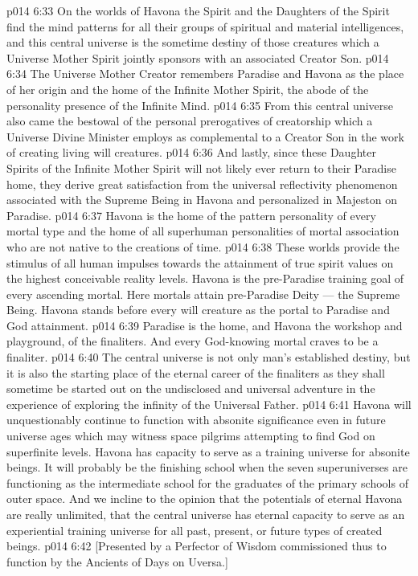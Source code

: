\vs p014 6:33 On the worlds of Havona the Spirit and the Daughters of the Spirit find the mind patterns for all their groups of spiritual and material intelligences, and this central universe is the sometime destiny of those creatures which a Universe Mother Spirit jointly sponsors with an associated Creator Son.
\vs p014 6:34 The Universe Mother Creator remembers Paradise and Havona as the place of her origin and the home of the Infinite Mother Spirit, the abode of the personality presence of the Infinite Mind.
\vs p014 6:35 From this central universe also came the bestowal of the personal prerogatives of creatorship which a Universe Divine Minister employs as complemental to a Creator Son in the work of creating living will creatures.
\vs p014 6:36 And lastly, since these Daughter Spirits of the Infinite Mother Spirit will not likely ever return to their Paradise home, they derive great satisfaction from the universal reflectivity phenomenon associated with the Supreme Being in Havona and personalized in Majeston on Paradise.
\vs p014 6:37 \bibnobreakspace {} Havona is the home of the pattern personality of every mortal type and the home of all superhuman personalities of mortal association who are not native to the creations of time.
\vs p014 6:38 These worlds provide the stimulus of all human impulses towards the attainment of true spirit values on the highest conceivable reality levels. Havona is the pre\hyp{}Paradise training goal of every ascending mortal. Here mortals attain pre\hyp{}Paradise Deity --- the Supreme Being. Havona stands before every will creature as the portal to Paradise and God attainment.
\vs p014 6:39 Paradise is the home, and Havona the workshop and playground, of the finaliters. And every God\hyp{}knowing mortal craves to be a finaliter.
\vs p014 6:40 The central universe is not only man’s established destiny, but it is also the starting place of the eternal career of the finaliters as they shall sometime be started out on the undisclosed and universal adventure in the experience of exploring the infinity of the Universal Father.
\vs p014 6:41 \pc Havona will unquestionably continue to function with absonite significance even in future universe ages which may witness space pilgrims attempting to find God on superfinite levels. Havona has capacity to serve as a training universe for absonite beings. It will probably be the finishing school when the seven superuniverses are functioning as the intermediate school for the graduates of the primary schools of outer space. And we incline to the opinion that the potentials of eternal Havona are really unlimited, that the central universe has eternal capacity to serve as an experiential training universe for all past, present, or future types of created beings.
\vsetoff
\vs p014 6:42 [Presented by a Perfector of Wisdom commissioned thus to function by the Ancients of Days on Uversa.]
\quizlink
